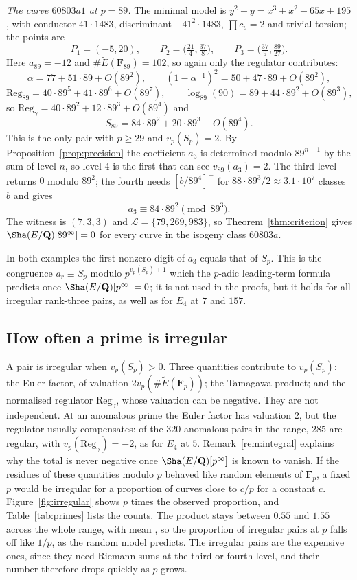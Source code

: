 \documentclass[11pt]{amsart}
\theoremstyle{definition}
\newcommand{\Q}{\mathbf{Q}}
\newcommand{\F}{\mathbf{F}}
\newcommand{\Reg}{\mathrm{Reg}}
\begin{document}
\emph{The curve $60803a1$ at $p=89$.} The minimal model is $y^2+y=x^3+x^2-65x+195$, with conductor $41\cdot1483$, discriminant $-41^2\cdot1483$, $\prod c_v=2$ and trivial torsion; the points are
\[
P_1=(-5,20),\qquad P_2=\bigl(\tfrac{21}{4},\tfrac{37}{8}\bigr),\qquad P_3=\bigl(\tfrac{37}{9},\tfrac{89}{27}\bigr).
\]
Here $a_{89}=-12$ and $\#\tilde E(\F_{89})=102$, so again only the regulator contributes:
\[
\alpha=77+51\cdot89+O(89^2),\qquad(1-\alpha^{-1})^2=50+47\cdot89+O(89^2),
\]
\[
\Reg_{89}=40\cdot89^5+41\cdot89^6+O(89^7),\qquad\log_{89}(90)=89+44\cdot89^2+O(89^3),
\]
so $\Reg_\gamma=40\cdot89^2+12\cdot89^3+O(89^4)$ and
\[
S_{89}=84\cdot89^2+20\cdot89^3+O(89^4).
\]
This is the only pair with $p\ge29$ and $v_p(S_p)=2$. By Proposition~\ref{prop:precision} the coefficient $a_3$ is determined modulo $89^{n-1}$ by the sum of level $n$, so level $4$ is the first that can see $v_{89}(a_3)=2$. The third level returns $0$ modulo $89^2$; the fourth needs $[b/89^4]^+$ for $88\cdot89^3/2\approx3.1\cdot10^7$ classes $b$ and gives
\[
a_3\equiv84\cdot89^2\pmod{89^3}.
\]
The witness is $(7,3,3)$ and $\mathcal L=\{79,269,983\}$, so Theorem~\ref{thm:criterion} gives $\Sha(E/\Q)[89^\infty]=0$ for every curve in the isogeny class $60803a$.

In both examples the first nonzero digit of $a_3$ equals that of $S_p$. This is the congruence $a_r\equiv S_p$ modulo $p^{v_p(S_p)+1}$ which the $p$-adic leading-term formula predicts once $\Sha(E/\Q)[p^\infty]=0$; it is not used in the proofs, but it holds for all \NBirregular{} irregular rank-three pairs, as well as for $E_4$ at $7$ and $157$.

\subsection{How often a prime is irregular}
A pair is irregular when $v_p(S_p)>0$. Three quantities contribute to $v_p(S_p)$: the Euler factor, of valuation $2v_p(\#\tilde E(\F_p))$; the Tamagawa product; and the normalised regulator $\Reg_\gamma$, whose valuation can be negative. They are not independent. At an anomalous prime the Euler factor has valuation $2$, but the regulator usually compensates: of the $320$ anomalous pairs in the range, $285$ are regular, with $v_p(\Reg_\gamma)=-2$, as for $E_4$ at $5$. Remark~\ref{rem:integral} explains why the total is never negative once $\Sha(E/\Q)[p^\infty]$ is known to vanish. If the residues of these quantities modulo $p$ behaved like random elements of $\F_p$, a fixed $p$ would be irregular for a proportion of curves close to $c/p$ for a constant $c$. Figure~\ref{fig:irregular} shows $p$ times the observed proportion, and Table~\ref{tab:primes} lists the counts. The product stays between $0.55$ and $1.55$ across the whole range, with mean \NBirrmean, so the proportion of irregular pairs at $p$ falls off like $1/p$, as the random model predicts. The irregular pairs are the expensive ones, since they need Riemann sums at the third or fourth level, and their number therefore drops quickly as $p$ grows.
\end{document}
